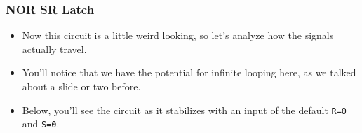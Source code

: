\documentclass{beamer}
\begin{document}
   		\begin{frame}
   			\frametitle{NOR SR Latch}
   			\begin{itemize}
   				\item Now this circuit is a little weird looking, so let's analyze how the signals actually travel.
   				\item You'll notice that we have the potential for infinite looping here, as we talked about a slide or two before.
   				\item Below, you'll see the circuit as it stabilizes with an input of the default \texttt{R=0} and \texttt{S=0}.
   			\end{itemize}
   			
   			{
   			\centering
   			
   			


\begin{tikzpicture}[x=0.75pt,y=0.75pt,yscale=-1,xscale=1]


\end{tikzpicture}}
\end{frame}
\end{document}
